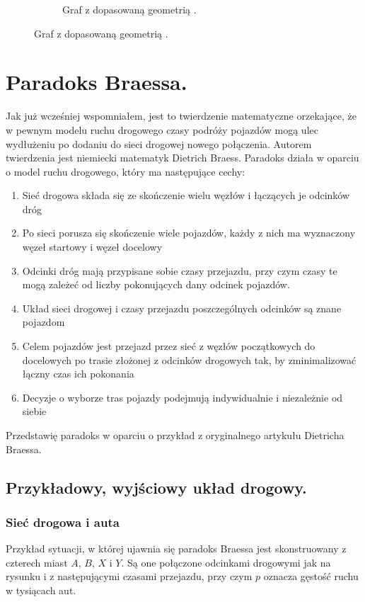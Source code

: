 \documentclass[twoside,12pt]{report}
\begin{document}
\begin{figure}[h]
\begin{flushright}
\begin{subfigure}[]{.45\textwidth}
	\caption{Graf z dopasowaną geometrią \cite{siux}.}
	\end{subfigure}
\end{flushright}
\end{figure}

\section{Paradoks Braessa.}

Jak już wcześniej wspomniałem, jest to twierdzenie matematyczne orzekające, że w pewnym modelu ruchu drogowego czasy podróży pojazdów mogą ulec wydłużeniu po dodaniu do sieci drogowej nowego połączenia. Autorem twierdzenia jest niemiecki matematyk Dietrich Braess\cite{braess}. Paradoks działa w oparciu o model ruchu drogowego, który ma następujące cechy:

\begin{enumerate}
\item Sieć drogowa składa się ze skończenie wielu węzłów i łączących je odcinków dróg
\item Po sieci porusza się skończenie wiele pojazdów, każdy z nich ma wyznaczony węzeł startowy i węzeł docelowy
\item Odcinki dróg mają przypisane sobie czasy przejazdu, przy czym czasy te mogą zależeć od liczby pokonujących dany odcinek pojazdów.
\item Układ sieci drogowej i czasy przejazdu poszczególnych odcinków są znane pojazdom
\item Celem pojazdów jest przejazd przez sieć z węzłów początkowych do docelowych po trasie złożonej z odcinków drogowych tak, by zminimalizować łączny czas ich pokonania
\item Decyzje o wyborze tras pojazdy podejmują indywidualnie i niezależnie od siebie
\end{enumerate}
Przedstawię paradoks w oparciu o przykład z oryginalnego artykułu Dietricha Braessa\cite{paradox}.

\subsection{Przykładowy, wyjściowy układ drogowy.}
\subsubsection{Sieć drogowa i auta}

Przykład sytuacji, w której ujawnia się paradoks Braessa jest skonstruowany z czterech miast $A$, $B$, $X$ i $Y$. Są one połączone odcinkami drogowymi jak na rysunku i z następującymi czasami przejazdu, przy czym $p$ oznacza gęstość ruchu w tysiącach aut.
\end{document}
